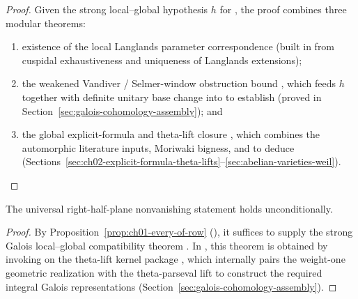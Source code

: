 \begin{proof}
Given the strong local--global hypothesis $h$ for
, the proof combines three modular
theorems:
\begin{enumerate}
  \item existence of the local Langlands parameter correspondence
   (built in
  from cuspidal exhaustiveness and uniqueness of Langlands extensions);
  \item the weakened Vandiver / Selmer-window obstruction bound
  , which feeds $h$ together with
  definite unitary base change
   into
   to establish
   (proved in
  Section~\ref{sec:galois-cohomology-assembly}); and
  \item the global explicit-formula and theta-lift closure
  ,
  which combines the automorphic literature inputs, Moriwaki bigness, and
   to deduce 
  (Sections~\ref{sec:ch02-explicit-formula-theta-lifts}--\ref{sec:abelian-varieties-weil}). \qedhere
\end{enumerate}
\end{proof}

\begin{theorem}
\label{thm:ch01-every-character}
The universal right-half-plane nonvanishing statement
 holds unconditionally.
\end{theorem}

\begin{proof}
By Proposition~\ref{prop:ch01-every-of-row}
(), it suffices to
supply the strong Galois local--global compatibility theorem
.
In ,
this theorem is obtained by invoking
 on the
theta-lift kernel package , which internally
pairs the weight-one geometric realization
 with the theta-parseval lift
to construct the required integral Galois representations
(Section~\ref{sec:galois-cohomology-assembly}).
\end{proof}

